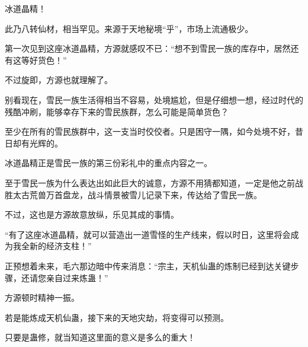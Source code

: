 \begin{this_body}
冰道晶精！

此乃八转仙材，相当罕见。来源于天地秘境“乎”，市场上流通极少。

第一次见到这座冰道晶精，方源就感叹不已：“想不到雪民一族的库存中，居然还有这等好货色！”

不过旋即，方源也就理解了。

别看现在，雪民一族生活得相当不容易，处境尴尬，但是仔细想一想，经过时代的残酷冲刷，能够幸存下来的雪民族群，怎么可能是简单货色？

至少在所有的雪民族群中，这一支当时佼佼者。只是困守一隅，如今处境不好，昔日却有光辉的。

冰道晶精正是雪民一族的第三份彩礼中的重点内容之一。

至于雪民一族为什么表达出如此巨大的诚意，方源不用猜都知道，一定是他之前战胜太古荒兽万首盘龙，战斗情景被雪儿记录下来，传达给了雪民一族。

不过，这也是方源故意放纵，乐见其成的事情。

“有了这座冰道晶精，就可以营造出一道雪怪的生产线来，假以时日，这里将会成为我全新的经济支柱！”

正预想着未来，毛六那边暗中传来消息：“宗主，天机仙蛊的炼制已经到达关键步骤，还请您亲自过来炼蛊！”

方源顿时精神一振。

若是能炼成天机仙蛊，接下来的天地灾劫，将变得可以预测。

只要是蛊修，就当知道这里面的意义是多么的重大！

\end{this_body}

